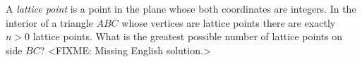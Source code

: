 \problem{}
A \emph{lattice point} is a point in the plane whose both coordinates are integers.
In the interior of a triangle $ABC$ whose vertices are lattice points there are exactly
$n > 0$ lattice points.
What is the greatest possible number of lattice points on side $BC$?
\solution
<FIXME: Missing English solution.>
\endproblem
